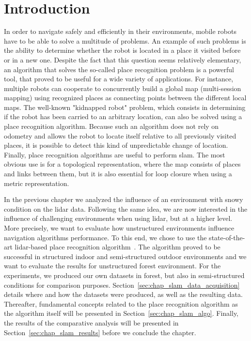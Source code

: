 \section{Introduction}
\label{sec:chap_slam_intro}

In order to navigate safely and efficiently in their environments, mobile robots have to be able to solve a multitude of problems. An example of such problems is the ability to determine whether the robot is located in a place it visited before or in a new one.  Despite the fact that this question seems relatively elementary, an algorithm that solves the so-called place recognition problem is a powerful tool, that proved to be useful for a wide variety of applications. For instance, multiple robots can cooperate to concurrently build a global map (multi-session mapping) using recognized places as connecting points between the different local maps. The well-known "kidnapped robot" problem, which consists in determining if the robot has been carried to an arbitrary location, can also be solved using a place recognition algorithm. Because such an algorithm does not rely on odometry and allows the robot to locate itself relative to all previously visited places, it is possible to detect this kind of unpredictable change of location. Finally, place recognition algorithms are useful to perform \gls*{slam}. The most obvious use is for a topological representation, where the map consists of places and links between them, but it is also essential for loop closure when using a metric representation. 

In the previous chapter we analyzed the influence of an environment with snowy condition on the \gls*{lidar} data. Following the same idea, we are now interested in the influence of challenging environments when using \gls*{lidar}, but at a higher level. More precisely, we want to evaluate how unstructured environments influence navigation algorithms performance. To this end, we chose to use the state-of-the-art \gls*{lidar}-based place recognition algorithm~\citep{Steder2011b}. The algorithm proved to be successful in structured indoor and semi-structured outdoor environments and we want to evaluate the results for unstructured forest environment. For the experiments, we produced our own datasets in forest, but also in semi-structured conditions for comparison purposes. Section~\ref{sec:chap_slam_data_acquisition} details where and how the datasets were produced, as well as the resulting data. Thereafter, fundamental concepts related to the place recognition algorithm as the algorithm itself will be presented in Section~\ref{sec:chap_slam_algo}. Finally, the results of the comparative analysis will be presented in Section~\ref{sec:chap_slam_results} before we conclude the chapter.


